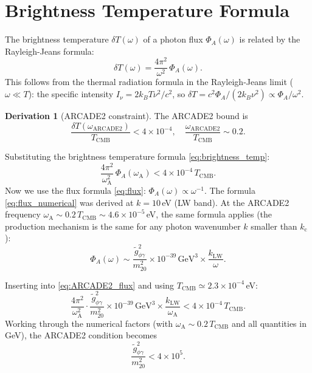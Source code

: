 \documentclass[12pt,a4paper]{report}
\newcommand{\kc}{k_{\mathrm{c}}}
\newcommand{\gtag}{\tilde{g}_{\phi\gamma}}
\newcommand{\LW}{\mathrm{LW}}
\newcommand{\TCMB}{T_{\mathrm{CMB}}}
\theoremstyle{definition}
\newtheorem{derivation}{Derivation}[chapter]
\begin{document}
\section{Brightness Temperature Formula}

The brightness temperature $\delta T(\omega)$ of a photon flux $\Phi_A(\omega)$ is
related by the Rayleigh-Jeans formula:
\begin{equation}
  \delta T(\omega) = \frac{4\pi^2}{\omega^2}\,\Phi_A(\omega).
  \label{eq:brightness_temp}
\end{equation}
This follows from the thermal radiation formula in the Rayleigh-Jeans limit
($\omega\ll T$): the specific intensity $I_\nu = 2k_B T \nu^2/c^2$, so
$\delta T = c^2 \Phi_A/(2k_B\nu^2) \propto \Phi_A/\omega^2$.

\begin{derivation}[ARCADE2 constraint]
The ARCADE2 bound is
\begin{equation}
  \frac{\delta T(\omega_{\mathrm{ARCADE2}})}{\TCMB} < 4\times10^{-4},
  \quad
  \frac{\omega_{\mathrm{ARCADE2}}}{\TCMB} \sim 0.2.
  \label{eq:ARCADE2}
\end{equation}

Substituting the brightness temperature formula \eqref{eq:brightness_temp}:
\begin{equation}
  \frac{4\pi^2}{\omega_{\mathrm{A}}^2}\,\Phi_A(\omega_{\mathrm{A}}) < 4\times10^{-4}\,\TCMB.
  \label{eq:ARCADE2_flux}
\end{equation}
Now we use the flux formula \eqref{eq:flux}: $\Phi_A(\omega) \propto \omega^{-1}$.
The formula \eqref{eq:flux_numerical} was derived at $k=10$\,eV (LW band). At the
ARCADE2 frequency $\omega_{\mathrm{A}}\sim 0.2\,\TCMB\sim 4.6\times10^{-5}$\,eV, the same
formula applies (the production mechanism is the same for any photon wavenumber $k$
smaller than $\kc$):
\begin{equation}
  \Phi_A(\omega) \sim \frac{\gtag^2}{m_{20}^2}\times10^{-39}\,\mathrm{GeV}^3
    \times\frac{k_{\LW}}{\omega}.
\end{equation}

Inserting into \eqref{eq:ARCADE2_flux} and using $\TCMB\simeq 2.3\times10^{-4}$\,eV:
\begin{equation}
  \frac{4\pi^2}{\omega_{\mathrm{A}}^2}
  \cdot\frac{\gtag^2}{m_{20}^2}\times10^{-39}\,\mathrm{GeV}^3\times\frac{k_{\LW}}{\omega_{\mathrm{A}}}
  < 4\times10^{-4}\,\TCMB.
\end{equation}
Working through the numerical factors (with $\omega_{\mathrm{A}}\sim 0.2\,\TCMB$ and all
quantities in GeV), the ARCADE2 condition becomes
\begin{equation}
  \boxed{\frac{\gtag^2}{m_{20}^2} < 4\times10^{5}.}
  \label{eq:ARCADE2_bound}
\end{equation}
\end{derivation}
\end{document}
